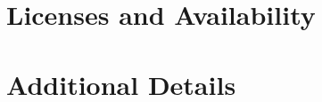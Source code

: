 \documentclass[11pt]{article}
\newif\ifcameraready
\newcommand{\camerareadyonly}[1]{\ifcameraready #1\fi}
\begin{document}
\section*{Licenses and Availability}


\camerareadyonly{%
\section*{Author Contributions}

\section*{Acknowledgments}

}




\appendix
\section{Additional Details}\label{sec:appendix}

\end{document}
